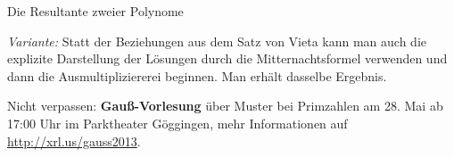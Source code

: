 \documentclass{algblatt}
\begin{document}
\begin{aufgabe}{Die Resultante zweier Polynome}
\begin{loesungE}
\emph{Variante:} Statt der Beziehungen aus dem Satz von Vieta kann man auch die
explizite Darstellung der Lösungen durch die Mitternachtsformel verwenden und
dann die Ausmultipliziererei beginnen. Man erhält dasselbe Ergebnis.
\end{loesungE}
\end{aufgabe}

Nicht verpassen: \textbf{Gauß-Vorlesung} über Muster bei Primzahlen am 28. Mai
ab 17:00 Uhr im Parktheater Göggingen, mehr Informationen auf
\url{http://xrl.us/gauss2013}.
 
\end{document}
